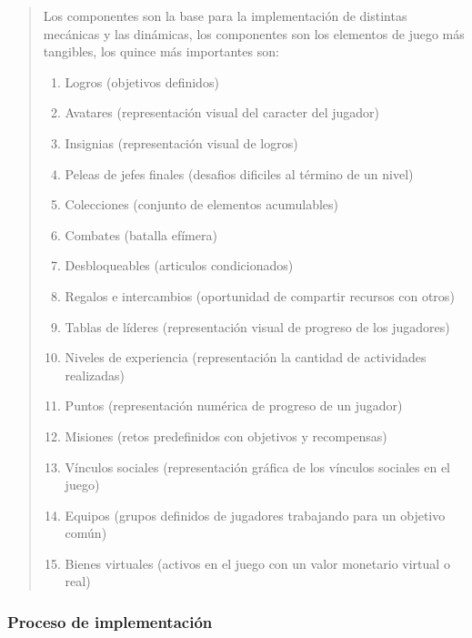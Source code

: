  \begin{quote}
    Los componentes son la base para la implementación de distintas mecánicas y las dinámicas,
    los componentes son los elementos de juego más tangibles, los quince más importantes son:
        
    \begin{enumerate}
        \item Logros (objetivos definidos)
        \item Avatares (representación visual del caracter del jugador)
        \item Insignias (representación visual de logros)
        \item Peleas de jefes finales (desafios dificiles al término de un nivel)
        \item Colecciones (conjunto de elementos acumulables)
        \item Combates (batalla efímera)
        \item Desbloqueables (articulos condicionados)
        \item Regalos e intercambios (oportunidad de compartir recursos con otros)
        \item Tablas de líderes (representación visual de progreso de los jugadores)
        \item Niveles de experiencia (representación la cantidad de actividades realizadas)
        \item Puntos (representación numérica de progreso de un jugador)
        \item Misiones (retos predefinidos con objetivos y recompensas)
        \item Vínculos sociales (representación gráfica de los vínculos sociales en el juego)
        \item Equipos (grupos definidos de jugadores trabajando para un objetivo común)
        \item Bienes virtuales (activos en el juego con un valor monetario virtual o real)
    \end{enumerate}
 \end{quote}

    
\subsubsection{Proceso de implementación}
    
